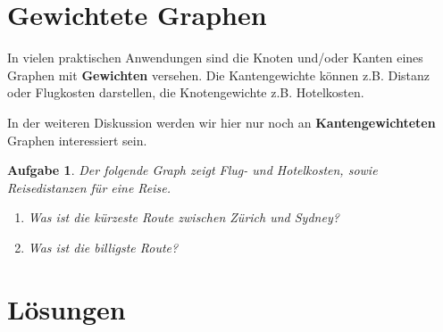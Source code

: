 \documentclass[12pt,a4paper]{report}
\theoremstyle{break}
\newtheorem{exercise}{Aufgabe}[section]
\theoremstyle{plain}
\begin{document}
\newpage
\section{Gewichtete Graphen}
\label{gewichtet}

In vielen praktischen Anwendungen sind die Knoten und/oder Kanten
eines Graphen mit \textbf{Gewichten} versehen. Die Kantengewichte k\"{o}nnen
z.B. Distanz oder Flugkosten darstellen, die Knotengewichte
z.B. Hotelkosten.

 In der weiteren Diskussion werden wir hier nur noch an \textbf{Kantengewichteten} Graphen interessiert sein.

\begin{exercise}\label{extravel}
Der folgende Graph zeigt Flug- und Hotelkosten, sowie Reisedistanzen
f\"{u}r eine Reise.


\begin{enumerate}
\item Was ist die \emph{k\"{u}rzeste} Route zwischen Z\"{u}rich und
    Sydney?
\item Was ist die \emph{billigste} Route?
\end{enumerate}
\end{exercise}

\newpage
\section{L\"{o}sungen}
\end{document}
